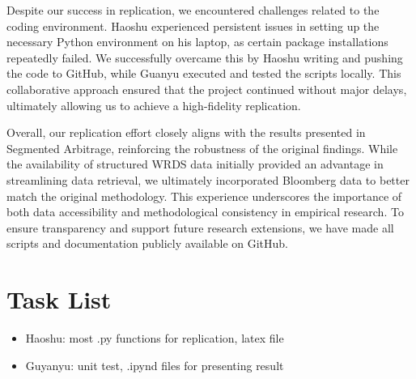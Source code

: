 \documentclass{article}
\begin{document}
Despite our success in replication, we encountered challenges related to the coding environment. Haoshu experienced persistent issues in setting up the necessary Python environment on his laptop, as certain package installations repeatedly failed. We successfully overcame this by Haoshu writing and pushing the code to GitHub, while Guanyu executed and tested the scripts locally. This collaborative approach ensured that the project continued without major delays, ultimately allowing us to achieve a high-fidelity replication.

Overall, our replication effort closely aligns with the results presented in Segmented Arbitrage, reinforcing the robustness of the original findings. While the availability of structured WRDS data initially provided an advantage in streamlining data retrieval, we ultimately incorporated Bloomberg data to better match the original methodology. This experience underscores the importance of both data accessibility and methodological consistency in empirical research. To ensure transparency and support future research extensions, we have made all scripts and documentation publicly available on GitHub.

\section{Task List}

\begin{itemize}
    \item Haoshu: most .py functions for replication, latex file
    \item Guyanyu: unit test, .ipynd files for presenting result
\end{itemize}












\clearpage






\end{document}
